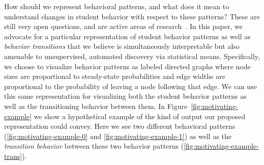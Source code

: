 How should we represent behavioral patterns, and what does it mean to
understand changes in student behavior with respect to these patterns?
These are still very open questions, and are active areas of
research~\cite{Kizilcec:2013:LAK, Faucon:2016:EDM, Davis:2016:EDM,
Shih:2010:EDM}. In this paper, we advocate for a particular representation
of student behavior patterns as well as \emph{behavior transitions} that we
believe is simultaneously interpretable but also amenable to unsupervised,
automated discovery via statistical means. Specifically, we choose to
visualize behavior patterns as labeled directed graphs where node sizes are
proportional to steady-state probabilities and edge widths are proportional
to the probability of leaving a node following that edge. We can use this
same representation for visualizing both the student behavior patterns as
well as the transitioning behavior between them. In
Figure~\ref{fig:motivating-example} we show a hypothetical example of the
kind of output our proposed representation could convey. Here we see two
different behavioral patterns (\ref{fig:motivating-example-0} and
\ref{fig:motivating-example-1}) as well as the \emph{transition behavior}
between these two behavior patterns (\ref{fig:motivating-example-trans}).
